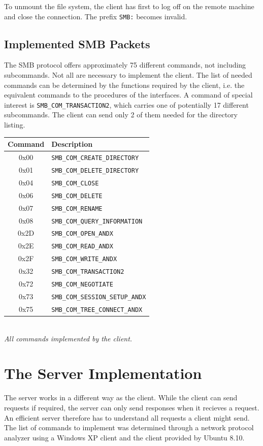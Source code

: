 \documentclass[11pt,a4paper]{book}
\begin{document}
To unmount the file system, the client has first to log off on the remote machine and close the connection. The prefix \texttt{SMB:} becomes invalid.

\subsection{Implemented SMB Packets}
The SMB protocol offers approximately 75 different commands, not including subcommands. Not all are necessary to implement the client. The list of needed commands can be determined by the functions required by the client, i.e. the equivalent commands to the procedures of the interfaces. A command of special interest is \texttt{SMB\_COM\_TRANSACTION2}, which carries one of potentially 17 different subcommands. The client can send only 2 of them needed for the directory listing.

\begin{center}
\begin{tabular}{c|l}
Command & Description \\ 
\hline
0x00 & \texttt{SMB\_COM\_CREATE\_DIRECTORY} \\
0x01 & \texttt{SMB\_COM\_DELETE\_DIRECTORY} \\
0x04 & \texttt{SMB\_COM\_CLOSE} \\
0x06 & \texttt{SMB\_COM\_DELETE} \\
0x07 & \texttt{SMB\_COM\_RENAME} \\
0x08 & \texttt{SMB\_COM\_QUERY\_INFORMATION} \\
0x2D & \texttt{SMB\_COM\_OPEN\_ANDX} \\
0x2E & \texttt{SMB\_COM\_READ\_ANDX} \\
0x2F & \texttt{SMB\_COM\_WRITE\_ANDX} \\
0x32 & \texttt{SMB\_COM\_TRANSACTION2} \\
0x72 & \texttt{SMB\_COM\_NEGOTIATE} \\
0x73 & \texttt{SMB\_COM\_SESSION\_SETUP\_ANDX} \\
0x75 & \texttt{SMB\_COM\_TREE\_CONNECT\_ANDX} \\
\end{tabular} \\
\vspace{6pt}
\textit{All commands implemented by the client.}
\end{center}

\section{The Server Implementation}
The server works in a different way as the client. While the client can send requests if required, the server can only send responses when it recieves a request. An efficient server therefore has to understand all requests a client might send. The list of commands to implement was determined through a network protocol analyzer using a Windows XP client and the client provided by Ubuntu 8.10.
\end{document}
